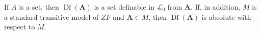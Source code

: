 If $A$ is a set, then $\operatorname{Df}(\mathbf{A})$ is a set definable in $\mathcal{L}_0$ from $\mathbf{A}$. If, in addition, $M$ is a standard transitive model of $ZF$ and $\mathbf{A} \in M$, then $\operatorname{Df}(\mathbf{A})$ is absolute with respect to $M$.
